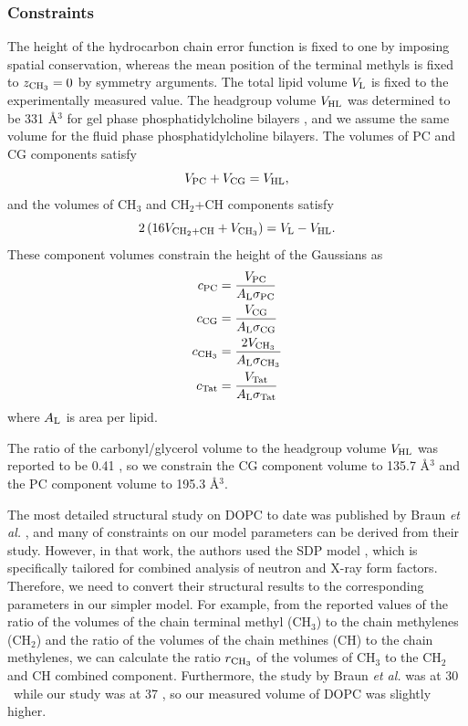 \subsubsection{Constraints}
The height of the hydrocarbon chain error function is fixed to one by imposing
spatial conservation, whereas the mean position of the terminal methyls is
fixed to $z_{\textrm{CH}_3}=0$ by symmetry arguments. The total lipid volume
$V_\textrm{L}$ is fixed to the experimentally measured value. 
The headgroup volume $V_\textrm{HL}$ was determined to be 331 \AA$^3$ for 
gel phase phosphatidylcholine bilayers \cite{ref:Tristram-Nagle02},
and we assume the same volume for the fluid phase phosphatidylcholine bilayers.
The volumes of PC and CG components satisfy
\begin{equation}
  V_\textrm{PC} + V_\textrm{CG} = V_\textrm{HL},
\end{equation}
and the volumes of CH$_3$ and CH$_2$+CH components satisfy
\begin{equation}
  2\left(16V_{\textrm{CH}_2+\textrm{CH}} + V_{\textrm{CH}_3}\right) = V_\textrm{L}-V_\textrm{HL}.
\end{equation}
These component volumes constrain the height of the Gaussians as
\begin{align}
  c_\textrm{PC} &= \frac{V_\textrm{PC}}{A_\textrm{L}\sigma_\textrm{PC}} \\
  c_\textrm{CG} &= \frac{V_\textrm{CG}}{A_\textrm{L}\sigma_\textrm{CG}} \\
  c_{\textrm{CH}_3} &= \frac{2V_{\textrm{CH}_3}}{A_\textrm{L}\sigma_{\textrm{CH}_3}} \\
  c_\textrm{Tat} &= \frac{V_\textrm{Tat}}{A_\textrm{L}\sigma_\textrm{Tat}}
\end{align}
where $A_\textrm{L}$ is area per lipid.

The ratio of 
the carbonyl/glycerol volume to the headgroup volume $V_\textrm{HL}$ was
reported to be 0.41 \cite{ref:Braun13}, so we constrain the CG
component volume to 135.7 \AA$^3$ and the PC component volume to 
195.3 \AA$^3$. 

The most detailed structural study on DOPC to date was published 
by Braun \textit{et al.} \cite{ref:Braun13}, 
and many of constraints on our model parameters can be derived
from their study. However, in that work, the authors used the 
SDP model \cite{ref:Kucerka08}, which is specifically tailored for
combined analysis of neutron and X-ray form factors. 
Therefore, we need to convert their structural results to the 
corresponding parameters in our simpler model. For example, 
from the reported values of the ratio of the volumes of the chain terminal
methyl (CH$_3$) to the chain methylenes (CH$_2$) and the ratio of 
the volumes of the chain methines (CH) to the chain methylenes, we can
calculate the ratio $r_{\textrm{CH}_3}$ of the volumes of CH$_3$ to the CH$_2$ and
CH combined component.  
Furthermore, the study by Braun \textit{et al.} was at 30 \textcelsius\
while our study was at 37 \textcelsius, so our
measured volume of DOPC was slightly higher.

